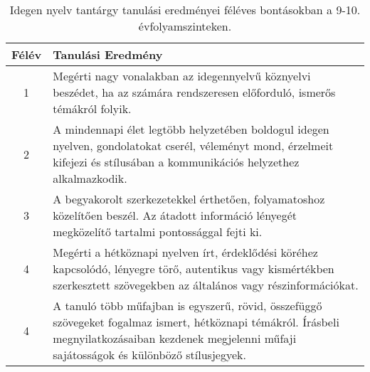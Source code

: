        
           \begin{longtable}{c | p{} }
            \caption[Idegen nyelv 9-10.]{Idegen nyelv tantárgy tanulási eredményei féléves bontásokban a 9-10. évfolyamszinteken. }  \\

            \textbf{Félév} & \textbf{Tanulási Eredmény} \\
            \hline
            \endhead
                                
                                          1 &  Megérti nagy vonalakban az idegennyelvű köznyelvi beszédet, ha az számára rendszeresen előforduló, ismerős témákról folyik. \\ \hline
                                          2 &  A mindennapi élet legtöbb helyzetében boldogul idegen nyelven, gondolatokat cserél, véleményt mond, érzelmeit kifejezi és stílusában a kommunikációs helyzethez alkalmazkodik. \\ \hline
                                          3 &  A begyakorolt szerkezetekkel érthetően, folyamatoshoz közelítően beszél. Az átadott információ lényegét megközelítő tartalmi pontossággal fejti ki. \\ \hline
                                          4 &  Megérti a hétköznapi nyelven írt, érdeklődési köréhez kapcsolódó, lényegre törő, autentikus vagy kismértékben szerkesztett szövegekben az általános vagy részinformációkat. \\ \hline
                                          4 &  A tanuló több műfajban is egyszerű, rövid, összefüggő szövegeket fogalmaz ismert, hétköznapi témákról. Írásbeli megnyilatkozásaiban kezdenek megjelenni műfaji sajátosságok és különböző stílusjegyek. \\ \hline
                                      
                        \end{longtable}
            \clearpage

